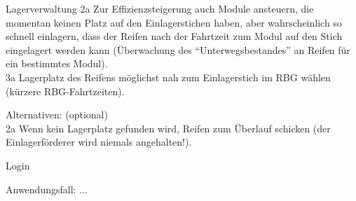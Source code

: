 \begin{function}{10}{Lagerverwaltung}
	2a Zur Effizienzsteigerung auch Module ansteuern, die momentan keinen Platz auf
	den Einlagerstichen haben, aber wahrscheinlich so schnell einlagern, dass der
	Reifen nach der Fahrtzeit zum Modul auf den Stich eingelagert werden kann
	(Überwachung des "`Unterwegsbestandes"' an Reifen für ein bestimmtes
	Modul).\\
	3a Lagerplatz des Reifens möglichst nah zum Einlagerstich im RBG wählen	(kürzere RBG-Fahrtzeiten).
\item[Alternativen:] (optional)\\
	2a Wenn kein Lagerplatz gefunden wird, Reifen zum Überlauf schicken (der
	Einlagerförderer wird niemals angehalten!).
\end{function}

\begin{function}{20}{Login}
\item[Anwendungsfall:] ...
\end{function}